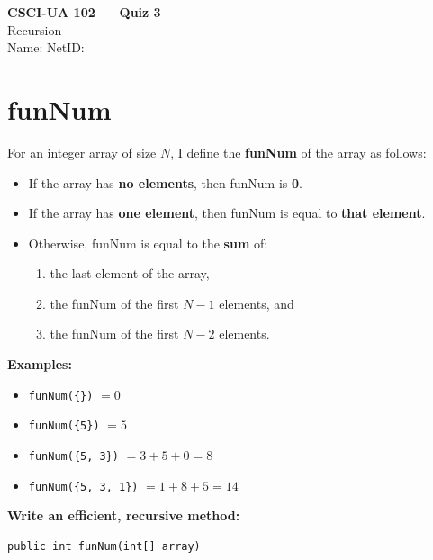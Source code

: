\documentclass[11pt]{article}
\begin{document}
\begin{center}
  {\Large \textbf{CSCI-UA 102 --- Quiz 3}} \\[6pt]
  {\large Recursion} \\[4pt]
  Name: \underline{\hspace{2.5in}} \quad NetID: \underline{\hspace{1.5in}}
\end{center}

\bigskip

\section*{funNum}

For an integer array of size $N$, I define the \textbf{funNum} of the array as follows:

\begin{itemize}[nosep]
  \item If the array has \textbf{no elements}, then funNum is \textbf{0}.
  \item If the array has \textbf{one element}, then funNum is equal to \textbf{that element}.
  \item Otherwise, funNum is equal to the \textbf{sum} of:
    \begin{enumerate}[nosep]
      \item the last element of the array,
      \item the funNum of the first $N-1$ elements, and
      \item the funNum of the first $N-2$ elements.
    \end{enumerate}
\end{itemize}

\bigskip

\noindent\textbf{Examples:}
\begin{itemize}[nosep]
  \item \texttt{funNum(\{\})} $= 0$
  \item \texttt{funNum(\{5\})} $= 5$
  \item \texttt{funNum(\{5, 3\})} $= 3 + 5 + 0 = 8$
  \item \texttt{funNum(\{5, 3, 1\})} $= 1 + 8 + 5 = 14$
\end{itemize}

\bigskip

\noindent\textbf{Write an efficient, recursive method:}
\begin{lstlisting}
public int funNum(int[] array)
\end{lstlisting}
\end{document}
